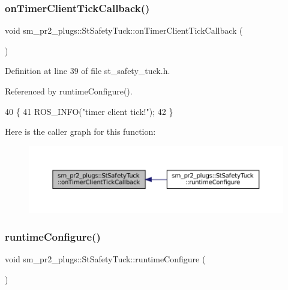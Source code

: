 \subsubsection{\texorpdfstring{on\+Timer\+Client\+Tick\+Callback()}{onTimerClientTickCallback()}}
{\footnotesize\ttfamily void sm\+\_\+pr2\+\_\+plugs\+::\+St\+Safety\+Tuck\+::on\+Timer\+Client\+Tick\+Callback (\begin{DoxyParamCaption}{ }\end{DoxyParamCaption})\hspace{0.3cm}{\ttfamily [inline]}}



Definition at line 39 of file st\+\_\+safety\+\_\+tuck.\+h.



Referenced by runtime\+Configure().


\begin{DoxyCode}
40     \{
41         ROS\_INFO(\textcolor{stringliteral}{"timer client tick!"});
42     \}
\end{DoxyCode}
Here is the caller graph for this function\+:
\nopagebreak
\begin{figure}[H]
\begin{center}
\leavevmode
\includegraphics[width=350pt]{structsm__pr2__plugs_1_1StSafetyTuck_aa1082813087c8201894aa1047ecf8a9b_icgraph}
\end{center}
\end{figure}
\mbox{\label{structsm__pr2__plugs_1_1StSafetyTuck_ae58dc354ff826ff1a124376272f75cc9}} 
\subsubsection{\texorpdfstring{runtime\+Configure()}{runtimeConfigure()}}
{\footnotesize\ttfamily void sm\+\_\+pr2\+\_\+plugs\+::\+St\+Safety\+Tuck\+::runtime\+Configure (\begin{DoxyParamCaption}{ }\end{DoxyParamCaption})\hspace{0.3cm}{\ttfamily [inline]}}



